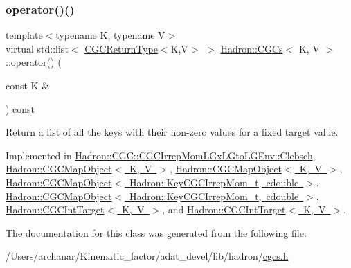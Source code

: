 \subsubsection{\texorpdfstring{operator()()}{operator()()}\hspace{0.1cm}{\footnotesize\ttfamily [4/4]}}
{\footnotesize\ttfamily template$<$typename K, typename V$>$ \\
virtual std\+::list$<$ \mbox{\hyperlink{structHadron_1_1CGCReturnType}{C\+G\+C\+Return\+Type}}$<$K,V$>$ $>$ \mbox{\hyperlink{classHadron_1_1CGCs}{Hadron\+::\+C\+G\+Cs}}$<$ K, V $>$\+::operator() (\begin{DoxyParamCaption}\item[{const K \&}]{ }\end{DoxyParamCaption}) const\hspace{0.3cm}{\ttfamily [pure virtual]}}



Return a list of all the keys with their non-\/zero values for a fixed target value. 



Implemented in \mbox{\hyperlink{classHadron_1_1CGC_1_1CGCIrrepMomLGxLGtoLGEnv_1_1Clebsch_a8a003db7855154fba35df2485da43353}{Hadron\+::\+C\+G\+C\+::\+C\+G\+C\+Irrep\+Mom\+L\+Gx\+L\+Gto\+L\+G\+Env\+::\+Clebsch}}, \mbox{\hyperlink{classHadron_1_1CGCMapObject_aeb342dc81f17743a25b969f540db4edf}{Hadron\+::\+C\+G\+C\+Map\+Object$<$ K, V $>$}}, \mbox{\hyperlink{classHadron_1_1CGCMapObject_aeb342dc81f17743a25b969f540db4edf}{Hadron\+::\+C\+G\+C\+Map\+Object$<$ K, V $>$}}, \mbox{\hyperlink{classHadron_1_1CGCMapObject_aeb342dc81f17743a25b969f540db4edf}{Hadron\+::\+C\+G\+C\+Map\+Object$<$ Hadron\+::\+Key\+C\+G\+C\+Irrep\+Mom\+\_\+t, cdouble $>$}}, \mbox{\hyperlink{classHadron_1_1CGCMapObject_aeb342dc81f17743a25b969f540db4edf}{Hadron\+::\+C\+G\+C\+Map\+Object$<$ Hadron\+::\+Key\+C\+G\+C\+Irrep\+Mom\+\_\+t, cdouble $>$}}, \mbox{\hyperlink{classHadron_1_1CGCIntTarget_a5946627ddb796961b97b7e0c57e32d83}{Hadron\+::\+C\+G\+C\+Int\+Target$<$ K, V $>$}}, and \mbox{\hyperlink{classHadron_1_1CGCIntTarget_a5946627ddb796961b97b7e0c57e32d83}{Hadron\+::\+C\+G\+C\+Int\+Target$<$ K, V $>$}}.



The documentation for this class was generated from the following file\+:\begin{DoxyCompactItemize}
\item 
/\+Users/archanar/\+Kinematic\+\_\+factor/adat\+\_\+devel/lib/hadron/\mbox{\hyperlink{lib_2hadron_2cgcs_8h}{cgcs.\+h}}\end{DoxyCompactItemize}
